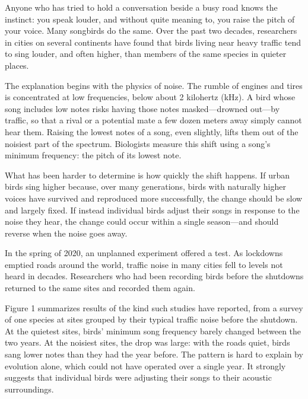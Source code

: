 \documentclass[11pt]{article}
\begin{document}
\clearpage
{}
\begin{passage}
Anyone who has tried to hold a conversation beside a busy road knows the instinct: you speak louder, and without quite meaning to, you raise the pitch of your voice. Many songbirds do the same. Over the past two decades, researchers in cities on several continents have found that birds living near heavy traffic tend to sing louder, and often higher, than members of the same species in quieter places.

The explanation begins with the physics of noise. The rumble of engines and tires is concentrated at low frequencies, below about 2 kilohertz (kHz). A bird whose song includes low notes risks having those notes masked---drowned out---by traffic, so that a rival or a potential mate a few dozen meters away simply cannot hear them. Raising the lowest notes of a song, even slightly, lifts them out of the noisiest part of the spectrum. Biologists measure this shift using a song's minimum frequency: the pitch of its lowest note.

What has been harder to determine is how quickly the shift happens. If urban birds sing higher because, over many generations, birds with naturally higher voices have survived and reproduced more successfully, the change should be slow and largely fixed. If instead individual birds adjust their songs in response to the noise they hear, the change could occur within a single season---and should reverse when the noise goes away.

In the spring of 2020, an unplanned experiment offered a test. As lockdowns emptied roads around the world, traffic noise in many cities fell to levels not heard in decades. Researchers who had been recording birds before the shutdowns returned to the same sites and recorded them again.

Figure 1 summarizes results of the kind such studies have reported, from a survey of one species at sites grouped by their typical traffic noise before the shutdown. At the quietest sites, birds' minimum song frequency barely changed between the two years. At the noisiest sites, the drop was large: with the roads quiet, birds sang lower notes than they had the year before. The pattern is hard to explain by evolution alone, which could not have operated over a single year. It strongly suggests that individual birds were adjusting their songs to their acoustic surroundings.


\end{passage}
\end{document}

